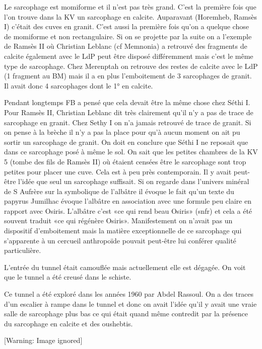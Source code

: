 \documentclass{article}
\begin{document}
Le sarcophage est momiforme et il n’est pas très grand. C’est la
première fois que l’on trouve dans la KV un sarcophage en calcite.
Auparavant (Horemheb, Ramsès I) c’était des cuves  en granit. C’est
aussi la première fois qu’on a quelque chose de momiforme et non
rectangulaire. Si on se projette par la suite on a l’exemple de Ramsès
II où Christian Leblanc (cf Memnonia) a retrouvé des fragments de
calcite également avec le LdP peut être disposé différemment mais c’est
le même type de sarcophage. Chez Merenptah on retrouve des restes de
calcite avec le LdP (1 fragment au BM) mais il a en plus l’emboitement
de 3 sarcophages de granit. Il avait donc 4 sarcophages dont le 1° en
calcite. 

Pendant longtemps FB a pensé que cela devait être la même chose chez
Séthi I. Pour Ramsès II, Christian Leblanc dit très clairement qu’il
n’y a pas de trace de sarcophage en granit. Chez Sethy I on n’a jamais
retrouvé de trace de granit. Si on pense à la brèche il n’y a pas la
place pour qu’à aucun moment on ait pu sortir un sarcophage de granit.
On doit en conclure que Séthi I ne reposait que dans ce sarcophage posé
à même le sol. On sait que les petites chambres de la KV 5 (tombe des
fils de Ramsès II) où étaient censées être le sarcophage sont trop
petites pour placer une cuve. Cela est à peu près contemporain. Il y
avait peut-être l’idée que seul un sarcophage suffisait. Si on regarde
dans l’univers minéral de S Aufrère sur la symbolique de l’albâtre il
évoque le fait qu’un texte du papyrus Jumilhac évoque l’albâtre en
association avec une formule peu claire en rapport avec Osiris.
L’albâtre c’est «ce qui rend beau Osiris» (snfr) et cela a été souvent
traduit «ce qui régénère Osiris». Manifestement on n’avait pas un
dispositif d’emboitement mais la matière exceptionnelle de ce
sarcophage qui s’apparente à un cercueil anthropoïde pouvait peut-être
lui conférer qualité particulière.

L’entrée du tunnel était camouflée mais actuellement elle est dégagée.
On voit que le tunnel a été creusé dans le schiste.

Ce tunnel a été exploré dans les années 1960 par Abdel Rassoul. On a des
traces d’un escalier à rampe dans le tunnel et donc on avait l’idée
qu’il y avait une vraie salle de sarcophage plus bas ce qui était quand
même contredit par la présence du sarcophage en calcite et des
oushebtis. 

  [Warning: Image ignored] %
 
\end{document}
